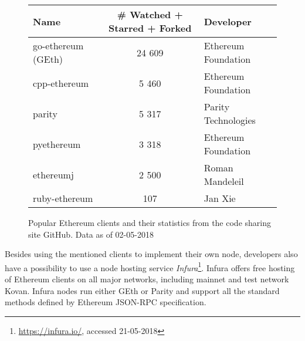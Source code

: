 \begin{figure}[ht]
    \centering
    \begin{tabular}{|l|c|l|}
        \hline
        \textbf{Name} & \textbf{\# Watched + Starred + Forked} & \textbf{Developer}\\
        \hline
        \hline
        go-ethereum (GEth) &24 609& Ethereum Foundation\\
        \hline
        cpp-ethereum &5 460& Ethereum Foundation\\
        \hline
        parity &5 317& Parity Technologies\\
        \hline
        pyethereum &3 318& Ethereum Foundation\\
        \hline
        ethereumj &2 500& Roman Mandeleil\\ 
        \hline
        ruby-ethereum &107& Jan Xie\\
        \hline
    \end{tabular}
    \caption{Popular Ethereum clients and their statistics from the code sharing site GitHub. Data as of 02-05-2018}
    \label{fig:eth-client-stats}
\end{figure}
 
Besides using the mentioned clients to implement their own node, developers also have a possibility to use a node hosting service \textit{Infura}\footnote{\url{https://infura.io/}, accessed 21-05-2018}. Infura offers free hosting of Ethereum clients on all major networks, including mainnet and test network Kovan\footnotemark. Infura nodes run either GEth or Parity and support all the standard methods defined by Ethereum JSON-RPC specification.
% 
